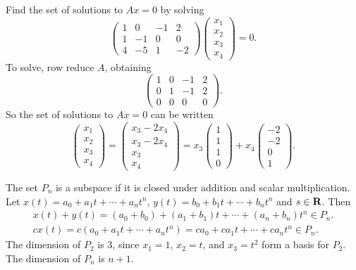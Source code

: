 \soln Find the set of solutions to $Ax = 0$ by solving
\[
\left(\begin{array}{rrrr} 1 & 0 & -1 & 2 \\ 1 & -1 & 0 & 0 \\ 4
& -5 & 1 & -2 \end{array}\right) \left(\begin{array}{r} x_1 \\ x_2
\\ x_3 \\ x_4 \end{array}\right) = 0.
\]
To solve, row reduce $A$, obtaining
\[
\left(\begin{array}{rrrr} 1 & 0 & -1 & 2 \\ 0 & 1 & -1 & 2 \\ 0
& 0 & 0 & 0 \end{array}\right).
\]
So the set of solutions to $Ax = 0$ can be written
\[
\left(\begin{array}{r} x_1 \\ x_2 \\ x_3 \\ x_4
\end{array}\right) = \left(\begin{array}{c} x_3 - 2x_4 \\ x_3 - 2x_4
\\ x_3 \\ x_4 \end{array}\right) = x_3\left(\begin{array}{r} 1 \\ 1
\\ 1 \\ 0 \end{array}\right) + x_4\left(\begin{array}{r} -2 \\ -2
\\ 0 \\ 1 \end{array}\right).
\]

The set $P_n$ is a subspace if it is closed under addition and
scalar multiplication.  Let $x(t) = a_0 + a_1t + \cdots +
a_nt^n$, $y(t) = b_0 + b_1t + \cdots + b_nt^n$ and $s \in \mbox{$\bf{R}$}$.
Then
\[
\begin{array}{l}
x(t) + y(t) = (a_0 + b_0) + (a_1 + b_1)t + \cdots + (a_n + b_n)t^n \in P_n.
\\
cx(t) = c(a_0 + a_1t + \cdots + a_nt^n) = ca_0 + ca_1t + \cdots + ca_nt^n
\in P_n.
\end{array}
\]
The dimension of $P_2$ is 3, since $x_1 = 1$, $x_2 = t$, and
$x_3 = t^2$ form a basis for $P_2$.  The dimension of $P_n$ is
$n + 1$.


